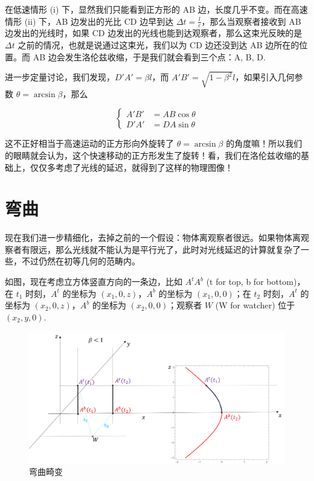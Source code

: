 \documentclass[12pt, a4paper, oneside]{ctexbook}
\begin{document}
\par   在低速情形 (i) 下，显然我们只能看到正方形的 AB 边，长度几乎不变。而在高速情形 (ii) 下，AB 边发出的光比 CD 边早到达 $\Delta t=\frac{l}{c}$，那么当观察者接收到 AB 边发出的光线时，如果 CD 边发出的光线也能到达观察者，那么这束光反映的是 $\Delta t$ 之前的情况，也就是说通过这束光，我们以为 CD 边还没到达 AB 边所在的位置。而 AB 边会发生洛伦兹收缩，于是我们就会看到三个点：A, B, D.

\par   进一步定量讨论，我们发现，$D'A'=\beta l$，而 $A'B'=\sqrt{1-\beta^{2}}l$，如果引入几何参数 $\theta=\arcsin\beta$，那么

\begin{equation}
	\left\{\begin{aligned}
		A'B'&=AB\cos\theta \\
		D'A'&=DA\sin\theta
	\end{aligned}\right.
\end{equation}

这不正好相当于高速运动的正方形向外旋转了 $\theta=\arcsin\beta$ 的角度嘛！所以我们的眼睛就会认为，这个快速移动的正方形发生了旋转！看，我们在洛伦兹收缩的基础上，仅仅多考虑了光线的延迟，就得到了这样的物理图像！


\section{弯曲}

现在我们进一步精细化，去掉之前的一个假设：物体离观察者很远。如果物体离观察者有限远，那么光线就不能认为是平行光了，此时对光线延迟的计算就复杂了一些，不过仍然在初等几何的范畴内。

\par   如图，现在考虑立方体竖直方向的一条边，比如 $A^{t}A^{b}$ (t for top, b for bottom)，在 $t_{1}$ 时刻，$A^{t}$ 的坐标为 $(x_{1},0,z)$，$A^{b}$ 的坐标为 $(x_{1},0,0)$；在 $t_{2}$ 时刻，$A^{t}$ 的坐标为 $(x_{2},0,z)$，$A^{b}$ 的坐标为 $(x_{2},0,0)$；观察者 $W$ (W for watcher) 位于 $(x_{2},y,0)$.

\begin{figure}[H]
	\centering
	\includegraphics[scale=0.47]{figures/bending-distortion.png}
	\caption{弯曲畸变}
\end{figure}
\end{document}
